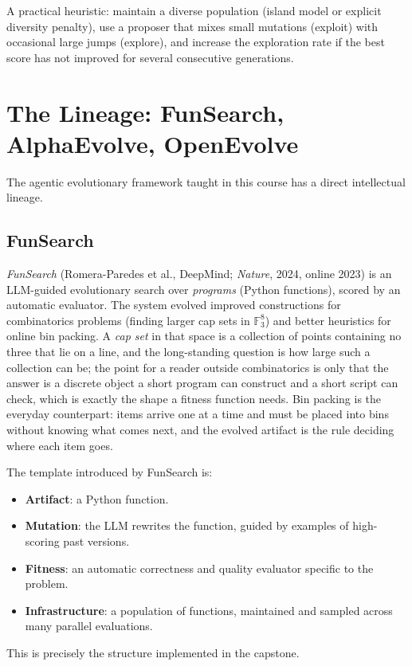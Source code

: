 A practical heuristic: maintain a diverse population (island model or explicit diversity penalty), use a proposer that mixes small mutations (exploit) with occasional large jumps (explore), and increase the exploration rate if the best score has not improved for several consecutive generations.

\section{The Lineage: FunSearch, AlphaEvolve, OpenEvolve}
\label{section:Lineage}

The agentic evolutionary framework taught in this course has a direct intellectual lineage.

\subsection{FunSearch}

\emph{FunSearch} (Romera-Paredes et al., DeepMind; \emph{Nature}, 2024, online 2023) is an LLM-guided evolutionary search over \emph{programs} (Python functions), scored by an automatic evaluator.
The system evolved improved constructions for combinatorics problems (finding larger cap sets in $\mathbb{F}_3^8$) and better heuristics for online bin packing.
A \emph{cap set} in that space is a collection of points containing no three that lie on a line, and the long-standing question is how large such a collection can be; the point for a reader outside combinatorics is only that the answer is a discrete object a short program can construct and a short script can check, which is exactly the shape a fitness function needs.
Bin packing is the everyday counterpart: items arrive one at a time and must be placed into bins without knowing what comes next, and the evolved artifact is the rule deciding where each item goes.

The template introduced by FunSearch is:
\begin{itemize}
\item \textbf{Artifact}: a Python function.
\item \textbf{Mutation}: the LLM rewrites the function, guided by examples of high-scoring past versions.
\item \textbf{Fitness}: an automatic correctness and quality evaluator specific to the problem.
\item \textbf{Infrastructure}: a population of functions, maintained and sampled across many parallel evaluations.
\end{itemize}
This is precisely the structure implemented in the capstone.

